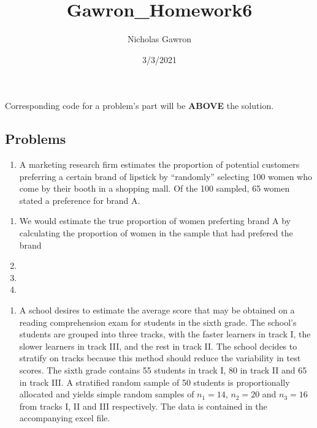 \documentclass[
]{article}
\title{Gawron\_Homework6}
\author{Nicholas Gawron}
\date{3/3/2021}
\newenvironment{Shaded}{\begin{snugshade}}{\end{snugshade}}
\newcommand{\DataTypeTok}[1]{\textcolor[rgb]{0.13,0.29,0.53}{#1}}
\newcommand{\KeywordTok}[1]{\textcolor[rgb]{0.13,0.29,0.53}{\textbf{#1}}}
\newcommand{\NormalTok}[1]{#1}
\newcommand{\OperatorTok}[1]{\textcolor[rgb]{0.81,0.36,0.00}{\textbf{#1}}}
\newcommand{\OtherTok}[1]{\textcolor[rgb]{0.56,0.35,0.01}{#1}}
\providecommand{\tightlist}{%
  \setlength{\itemsep}{0pt}\setlength{\parskip}{0pt}}
\begin{document}
\maketitle

\begin{Shaded}
\end{Shaded}

Corresponding code for a problem's part will be \textbf{ABOVE} the
solution.

\hypertarget{problems}{%
\subsection{Problems}\label{problems}}

\begin{enumerate}
\def\labelenumi{\arabic{enumi}.}
\tightlist
\item
  A marketing research firm estimates the proportion of potential
  customers preferring a certain brand of lipstick by ``randomly''
  selecting 100 women who come by their booth in a shopping mall. Of the
  100 sampled, 65 women stated a preference for brand A.
\end{enumerate}

\begin{enumerate}
\def\labelenumi{\alph{enumi}.}
\item
  We would estimate the true proportion of women preferting brand A by
  calculating the proportion of women in the sample that had prefered
  the brand
\item
\item
\item
\end{enumerate}

\begin{enumerate}
\def\labelenumi{\arabic{enumi}.}
\setcounter{enumi}{1}
\tightlist
\item
  A school desires to estimate the average score that may be obtained on
  a reading comprehension exam for students in the sixth grade. The
  school's students are grouped into three tracks, with the faster
  learners in track I, the slower learners in track III, and the rest in
  track II. The school decides to stratify on tracks because this method
  should reduce the variability in test scores. The sixth grade contains
  55 students in track I, 80 in track II and 65 in track III. A
  stratified random sample of 50 students is proportionally allocated
  and yields simple random samples of \(n_1 = 14\), \(n_2 = 20\) and
  \(n_3=16\) from tracks I, II and III respectively. The data is
  contained in the accompanying excel file.
\end{enumerate}
\end{document}
